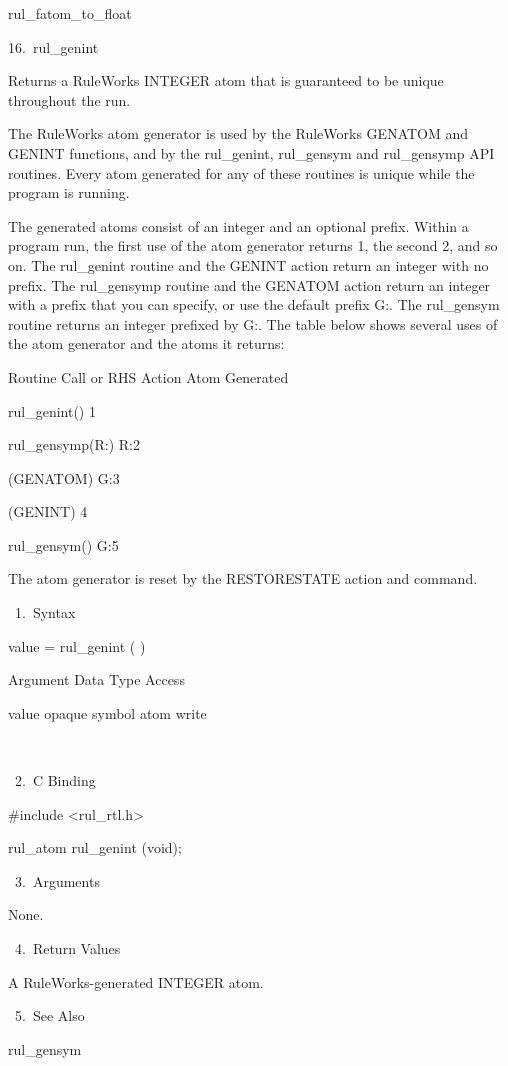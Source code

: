     rul_fatom_to_float

16. rul_genint

    Returns a RuleWorks INTEGER atom that is
    guaranteed to be unique throughout the
    run.

    The RuleWorks atom generator is used by
    the RuleWorks GENATOM and GENINT
    functions, and by the rul_genint,
    rul_gensym and rul_gensymp API routines.
    Every atom generated for any of these
    routines is unique while the program is
    running.

    The generated atoms consist of an integer
    and an optional prefix. Within a program
    run, the first use of the atom generator
    returns 1, the second 2, and so on. The
    rul_genint routine and the GENINT action
    return an integer with no prefix. The
    rul_gensymp routine and the GENATOM action
    return an integer with a prefix that you
    can specify, or use the default prefix G:.
    The rul_gensym routine returns an integer
    prefixed by G:. The table below shows
    several uses of the atom generator and the
    atoms it returns:

    Routine Call or RHS Action   Atom
    Generated

    rul_genint()    1

    rul_gensymp(R:)    R:2

    (GENATOM)    G:3

    (GENINT)    4

    rul_gensym()    G:5

    The atom generator is reset by the
    RESTORESTATE  action and command.

       1. Syntax

          value = rul_genint ( )

          Argument  Data Type    Access

          value  opaque symbol atom  write

           

       2. C Binding

          #include <rul_rtl.h>

          rul_atom rul_genint (void);

       3. Arguments

          None.

       4. Return Values

          A RuleWorks-generated INTEGER atom.

       5. See Also

    rul_gensym

